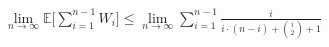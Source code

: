 \documentclass[preview]{standalone}
\begin{document}
\begin{align*}
\lim_{n\to\infty} \mathbb{E} \Bigg[ \sum_{i=1}^{n-1} W_i \Bigg] \leq \lim_{n\to\infty} \sum_{i=1}^{n-1} \frac{i}{i \cdot (n-i) + \binom{i}{2} + 1}
\end{align*}
\end{document}
